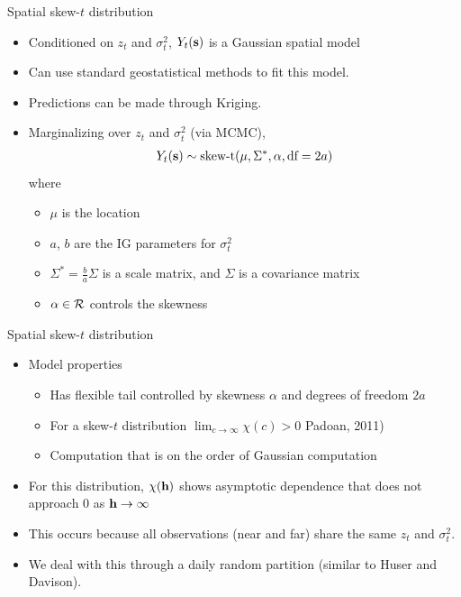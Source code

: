 \documentclass{beamer}
\begin{document}
\begin{frame}{Spatial skew-$t$ distribution}
  \begin{itemize} \setlength{\itemsep}{0.5em}
   \item \alert{Conditioned} on $z_t$ and $\sigma^2_t$, $Y_t(\mbox{\bf s})$ is a Gaussian spatial model
    \item Can use standard geostatistical methods to fit this model.
    \item Predictions can be made through Kriging.
    \item \alert{Marginalizing} over $z_t$ and $\sigma^2_t$ (via MCMC),
    \begin{align*}
      Y_t(\mbox{\bf s}) \sim \text{skew-t}(\mu, \Sigma^*, \alpha, \text{df}=2a)
    \end{align*}
    where
    \begin{itemize}
    	\item $\mu$ is the location
	\item $a$, $b$ are the IG parameters for $\sigma^2_t$
	\item $\Sigma^* = \frac{ b }{ a } \Sigma$ is a scale matrix, and $\Sigma$ is a \Matern covariance matrix
	\item $\alpha \in {\cal R}$ controls the skewness
    \end{itemize}
  \end{itemize}
\end{frame}

\begin{frame}{Spatial skew-$t$ distribution}
  \begin{itemize} \setlength{\itemsep}{0.5em}
      \item Model properties
    \begin{itemize}
    	\item Has flexible tail controlled by skewness $\alpha$ and degrees of freedom $2a$
    	\item For a skew-$t$ distribution $\lim_{c \rightarrow \infty} \chi(c) > 0$ Padoan, 2011)
    	\item Computation that is on the order of Gaussian computation
    \end{itemize}
    \item For this distribution, $\chi(\mbox{\bf h})$ shows asymptotic dependence that does not approach 0 as $\mbox{\bf h} \rightarrow \infty$ 
   \item This occurs because all observations (near and far) share the same $z_t$ and $\sigma_t^2$.
    \item We deal with this through a daily random partition (similar to Huser and Davison).
  \end{itemize}
\end{frame}
\end{document}
